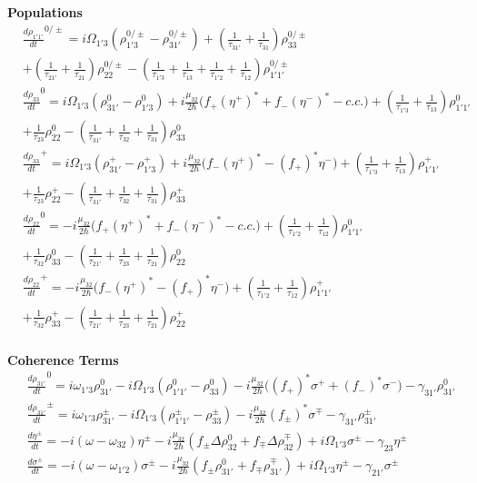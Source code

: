 \documentclass[10pt,english,fleqn]{article}%
\begin{document}
\textbf{Populations}
\begin{align}
&\frac{d \rho_{1'1'}}{d t}^{0/\pm} = i\Omega_{1'3} (\rho_{1'3}^{0/\pm} - \rho_{31'}^{0/\pm}) + (\frac{1}{\tau_{31'}} + \frac{1}{\tau_{31}})\rho_{33}^{0/\pm}  \nonumber \\ 
& + (\frac{1}{\tau_{21'}} + \frac{1}{\tau_{21}})\rho_{22}^{0/\pm} - (\frac{1}{\tau_{1'3}} + \frac{1}{\tau_{13}} + \frac{1}{\tau_{1'2}} + \frac{1}{\tau_{12}})\rho_{1'1'}^{0/\pm} \\
&\frac{d \rho_{33}}{d t}^0 = i\Omega_{1'3} (\rho_{31'}^0 - \rho_{1'3}^0) + i\frac{\mu_{32}}{2\hbar} \big (f_+ (\eta^+)^* + f_-(\eta^-)^* -c.c. \big )+ (\frac{1}{\tau_{1'3}} 
+ \frac{1}{\tau_{13}})\rho_{1'1'}^0 \nonumber \\ 
& +  \frac{1}{\tau_{23}}\rho_{22}^0 - (\frac{1}{\tau_{31'}} + \frac{1}{\tau_{32}} + \frac{1}{\tau_{31}}) \rho_{33}^0 \\
&\frac{d \rho_{33}}{d t}^+   = i\Omega_{1'3} (\rho_{31'}^+ - \rho_{1'3}^+) + i\frac{\mu_{32}}{2\hbar}\big (f_- (\eta^+)^* - (f_+)^*\eta^- \big ) 
+ (\frac{1}{\tau_{1'3}} + \frac{1}{\tau_{13}})\rho_{1'1'}^+ \nonumber \\ 
& +  \frac{1}{\tau_{23}}\rho_{22}^+ - (\frac{1}{\tau_{31'}} + \frac{1}{\tau_{32}} + \frac{1}{\tau_{31}}) \rho_{33}^+ \\
&\frac{d \rho_{22}}{d t}^0  = -i\frac{\mu_{32}}{2\hbar} \big (f_+ (\eta^+)^* + f_-(\eta^-)^* -c.c. \big) + (\frac{1}{\tau_{1'2}} + \frac{1}{\tau_{12}})\rho_{1'1'}^0 \\ 
& +  \frac{1}{\tau_{32}}\rho_{33}^0 - (\frac{1}{\tau_{21'}} + \frac{1}{\tau_{23}} + \frac{1}{\tau_{21}}) \rho_{22}^0 \\
&\frac{d \rho_{22}}{d t}^+   = -i\frac{\mu_{32}}{2\hbar} \big (f_- (\eta^+)^* - (f_+)^*\eta^- \big ) + (\frac{1}{\tau_{1'2}} + \frac{1}{\tau_{12}})\rho_{1'1'}^+ \\ 
& +  \frac{1}{\tau_{32}}\rho_{33}^+ - (\frac{1}{\tau_{21'}} + \frac{1}{\tau_{23}} + \frac{1}{\tau_{21}}) \rho_{22}^+ \\
\end{align}

\textbf{Coherence Terms}
\begin{align}
&\frac{d \rho_{31'}}{d t}^0  = i\omega_{1'3}\rho_{31'}^0 -i \Omega_{1'3}(\rho_{1'1'}^0 - \rho_{33}^0) -i\frac{\mu_{32}}{2 \hbar}\big ((f_+)^*\sigma^+ 
+ (f_-)^*\sigma^- \big ) -\gamma_{31'}\rho_{31'}^0 \\
&\frac{d \rho_{31'}}{d t} ^\pm = i\omega_{1'3}\rho_{31'}^\pm  -i\Omega_{1'3}(\rho_{1'1'}^\pm - \rho_{33}^\pm) -i \frac{\mu_{32}}{2 \hbar} (f_{\pm})^* \sigma^{\mp} 
- \gamma_{31'} \rho_{31'}^{\pm}\\
&\frac{d \eta^\pm}{d t}   = -i(\omega - \omega_{32})\eta^\pm -i \frac{\mu_{32}}{2\hbar}(f_\pm \Delta\rho_{32}^0 + f_\mp \Delta\rho_{32}^\mp) +  i\Omega_{1'3}\sigma^{\pm}
- \gamma_{23}\eta^\pm \\
&\frac{d \sigma^\pm}{d t}  = -i(\omega - \omega_{1'2})\sigma^\pm -i \frac{\mu_{32}}{2\hbar}(f_\pm \rho_{31'}^0 + f_\mp \rho_{31'}^\mp) +  i\Omega_{1'3}\eta^{\pm}
- \gamma_{21'}\sigma^\pm
\end{align}
\end{document}
